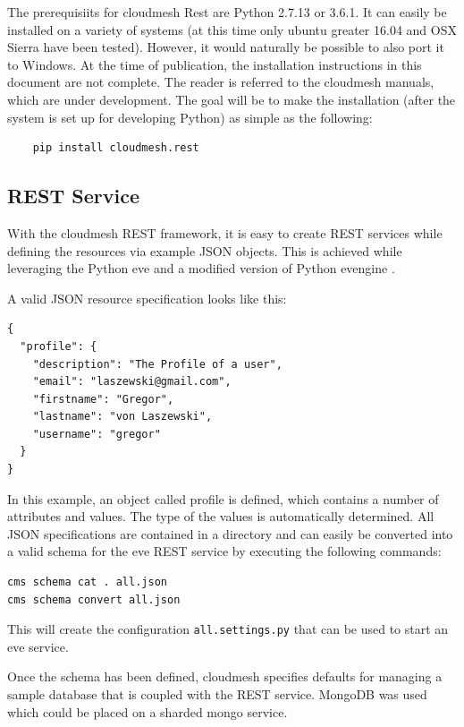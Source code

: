 \documentclass[10pt]{article}
\begin{document}
The prerequisiits for cloudmesh Rest are Python 2.7.13 or 3.6.1.
It can easily be installed on a variety of systems (at this time
only ubuntu greater 16.04 and OSX Sierra have been tested). However, it would
naturally be possible to also port it to Windows. At the time of publication, the installation
instructions in this document are not complete. The reader is
referred to the cloudmesh manuals, which are under development. The goal
will be to make the installation (after the system is set up for
developing Python) as simple as the following:

\begin{verbatim}
    pip install cloudmesh.rest
\end{verbatim}


\subsection{REST Service}\label{cm-rest}

With the cloudmesh REST framework, it is easy to create REST services
while defining the resources via example JSON objects. This is achieved
while leveraging the Python eve \cite{www-eve} and a modified version of Python
evengine \cite{www-cloudmesh-eveengine}. 

A valid JSON resource specification looks like this:

\begin{verbatim}
{
  "profile": {
    "description": "The Profile of a user",
    "email": "laszewski@gmail.com",
    "firstname": "Gregor",
    "lastname": "von Laszewski",
    "username": "gregor"
  }
}
\end{verbatim}

In this example, an object called profile is defined, which contains a number of
attributes and values. The type of the values is automatically
determined. All JSON specifications are contained in a directory and
can easily be converted into a valid schema for the eve REST service
by executing the following commands:

\begin{verbatim}
cms schema cat . all.json
cms schema convert all.json
\end{verbatim}

This will create the configuration \verb|all.settings.py| that can
be used to start an eve service.

Once the schema has been defined, cloudmesh specifies defaults for managing
a sample database that is coupled with the REST service. 
MongoDB was used which could be placed on a sharded mongo service. 
\end{document}
